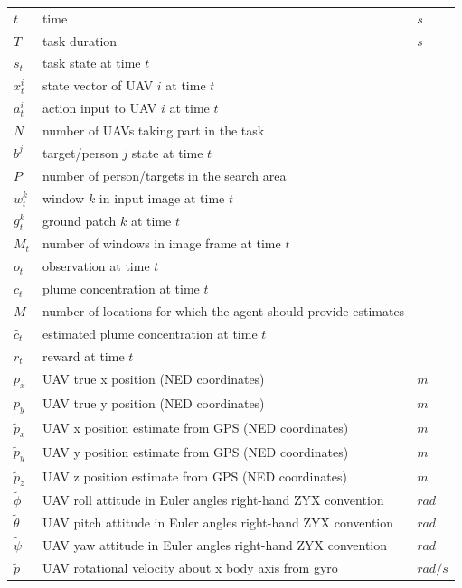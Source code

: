 \documentclass[a4paper,11pt]{report}
\begin{document}
\begin{table}[ht]  
\begin{tabular}{l l l}
	 $t$ & time & $s$\\
	 $T$ & task duration & $s$\\
	 $s_t$ & task state at time $t$ & \\
	 $x^i_t$ & state vector of UAV $i$ at time $t$ & \\
	 $a^i_t$ & action input to UAV $i$ at time $t$ & \\	
	 $N$ & number of UAVs taking part in the task &\\
	 $b^j$ & target/person $j$ state at time $t$ & \\
	 $P$ & number of person/targets in the search area &\\	 
     $w^k_t$ & window $k$ in input image at time $t$ & \\	
	 $g^k_t$ & ground patch $k$ at time $t$ & \\	
	 $M_t$ & number of windows in image frame at time $t$ \\ 
	 $o_t$ & observation at time $t$ & \\	
	 $c_t$ & plume concentration at time $t$ & \\
	 $M$ & number of locations for which the agent should provide estimates & \\ 
	 $\hat{c}_t$ & estimated plume concentration at time $t$ & \\
	 $r_t$ & reward at time $t$ & \\
     $p_x$ & UAV true x position (NED coordinates)            & $m$\\
     $p_y$ & UAV true y position (NED coordinates)            & $m$\\
     $\tilde{p}_x$ & UAV x position estimate from GPS (NED coordinates)            & $m$\\
     $\tilde{p}_y$ & UAV y position estimate from GPS (NED coordinates)            & $m$\\
     $\tilde{p}_z$ & UAV z position estimate from GPS (NED coordinates)            & $m$\\
     $\tilde{\phi}$ & UAV roll attitude in Euler angles right-hand ZYX convention & $rad$\\
     $\tilde{\theta}$ & UAV pitch attitude in Euler angles right-hand ZYX convention& $rad$\\
     $\tilde{\psi}$ & UAV yaw attitude in Euler angles right-hand ZYX convention  & $rad$\\
     $\tilde{p}$  & UAV rotational velocity about x body axis from gyro                 & $rad/s$\\ 

\end{tabular}
\end{table}
\end{document}
